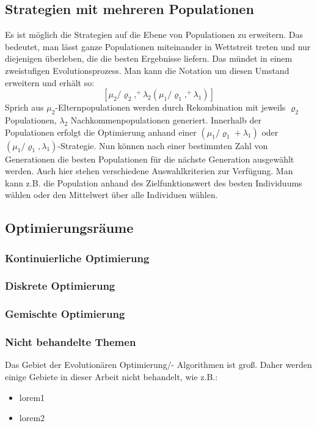 \subsection{Strategien mit mehreren Populationen}
Es ist möglich die Strategien auf die Ebene von Populationen zu erweitern. Das bedeutet, man lässt ganze Populationen miteinander in Wettstreit treten und nur diejenigen überleben, die die besten Ergebnisse liefern. Das mündet in einem zweistufigen Evolutionsprozess. Man kann die Notation um diesen Umstand erweitern und erhält so:
%
$$
[\mu_2/\varrho_2,^{+}\lambda_2(\mu_1/\varrho_1,^{+}\lambda_1)]
$$
Sprich aus $\mu_2$-Elternpopulationen werden durch Rekombination mit jeweils $\varrho_2$ Populationen, $\lambda_2$ Nachkommenpopulationen generiert. Innerhalb der Populationen erfolgt die Optimierung anhand einer $({\mu_1}/{\varrho_1}+\lambda_1)$ oder $({\mu_1}/{\varrho_1},\lambda_1)$-Strategie. Nun können nach einer bestimmten Zahl von Generationen die besten Populationen für die nächste Generation ausgewählt werden. Auch hier stehen verschiedene Auswahlkriterien zur Verfügung. Man kann z.B. die Population anhand des Zielfunktionswert des besten Individuums wählen oder den Mittelwert über alle Individuen wählen.
%
\subsection{Optimierungsräume}
\lipsum[1]
%
\subsubsection{Kontinuierliche Optimierung}
%
\lipsum[1]
%
\subsubsection{Diskrete Optimierung}
%
\lipsum[1]
%
\subsubsection{Gemischte Optimierung}
%
\lipsum[1]
%
\subsubsection{Nicht behandelte Themen}
%
Das Gebiet der Evolutionären Optimierung/- Algorithmen ist groß. Daher werden einige Gebiete in dieser Arbeit nicht behandelt, wie z.B.:
%
\begin{itemize}[itemsep=0mm]
\item lorem1
\item lorem2
\end{itemize}
